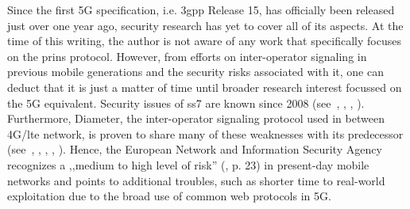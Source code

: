 Since the first 5G specification, i.e. \gls{3gpp} Release 15, has officially been released just over one year ago, security research has yet to cover all of its aspects.
At the time of this writing, the author is not aware of any work that specifically focuses on the \gls{prins} protocol.
However, from efforts on inter-operator signaling in previous mobile generations and the security risks associated with it, one can deduct that it is just a matter of time until broader research interest focussed on the 5G equivalent.
Security issues of \gls{ss7} are known since 2008 (see~\cite{engel2008locating}, \cite{engel2014locate}, \cite{oliveira2014world}, \cite{puzankov2014how}).
Furthermore, Diameter, the inter-operator signaling protocol used in between 4G/\gls{lte} network, is proven to share many of these weaknesses with its predecessor (see~\cite{rao2015unblock}, \cite{rao2016privacy}, \cite{rao2016where}, \cite{holtmanns2016user}, \cite{holtmanns2017sms}).
Hence, the European Network and Information Security Agency recognizes a ,,medium to high level of risk'' (\cite{enisa2018signal}, p. 23) in present-day mobile networks and points to additional troubles, such as shorter time to real-world exploitation due to the broad use of common web protocols in 5G.
